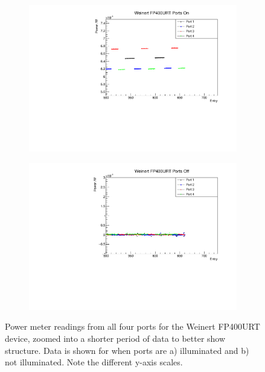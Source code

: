 \documentclass[a4paper,11pt]{article}
\begin{document}
\begin{figure}[h!]
\centering
\begin{subfigure}{0.5\textwidth}
\includegraphics[width=\linewidth]{WeinertFP400URTPortsOnZoom.pdf}
\subcaption{}\label{fig:weinfp400crosstalkon}
\end{subfigure}%
\begin{subfigure}{0.5\textwidth}
\includegraphics[width=\linewidth]{WeinertFP400URTPortsOffZoom.pdf}
\subcaption{}\label{fig:weinfp400crosstalkoff}
\end{subfigure}
\caption{Power meter readings from all four ports for the Weinert FP400URT device, zoomed into a shorter period of data to better show structure. Data is shown for when ports are a) illuminated and b) not illuminated. Note the different y-axis scales.}\label{fig:weinfp400crosstalk}
\end{figure}
\end{document}
